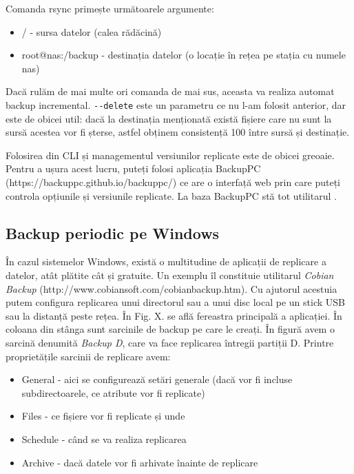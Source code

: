 Comanda rsync primește următoarele argumente:

\begin{itemize}
	\item / - sursa datelor (calea rădăcină)
	\item root@nas:/backup - destinația datelor (o locație în rețea pe
		stația cu numele nas)
\end{itemize}


Dacă rulăm de mai multe ori comanda de mai sus, aceasta va realiza automat
backup incremental. \texttt{-{}-delete} este un parametru ce nu l-am folosit
anterior, dar este de obicei util: dacă la destinația menționată există fișiere
care nu sunt la sursă acestea vor fi șterse, astfel obținem consistență 100%
între sursă și destinație.


Folosirea  din CLI și managementul versiunilor replicate este de obicei
greoaie. Pentru a ușura acest lucru, puteți folosi aplicația BackupPC
(https://backuppc.github.io/backuppc/) ce are o interfață web prin care puteți
controla opțiunile și versiunile replicate. La baza BackupPC stă tot utilitarul
.

\subsection{Backup periodic pe Windows}
\label{sec:storage-backup-windows}

În cazul sistemelor Windows, există o multitudine de aplicații de replicare a
datelor, atât plătite cât și gratuite. Un exemplu îl constituie utilitarul
\textit{Cobian Backup} (http://www.cobiansoft.com/cobianbackup.htm). Cu ajutorul
acestuia putem configura replicarea unui directorul sau a unui disc local pe un
stick USB sau la distanță peste rețea. În Fig. X. se află fereastra principală a
aplicației. În coloana din stânga sunt sarcinile de backup pe care le creați. În
figură avem o sarcină denumită \textit{Backup D}, care va face replicarea
întregii partiții D. Printre proprietățile sarcinii de replicare avem:

\begin{itemize}
	\item General - aici se configurează setări generale (dacă vor fi
		incluse subdirectoarele, ce atribute vor fi replicate)
	\item Files - ce fișiere vor fi replicate și unde
	\item Schedule - când se va realiza replicarea
	\item Archive - dacă datele vor fi arhivate înainte de replicare
\end{itemize}

